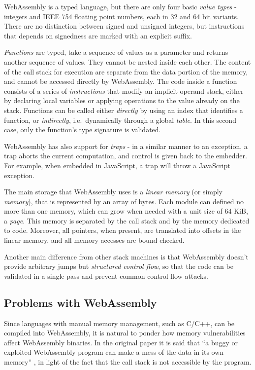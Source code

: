 WebAssembly is a typed language, but there are only four basic \textit{value types} - integers and IEEE 754 floating
point numbers, each in 32 and 64 bit variants. There are no distinction between signed and unsigned integers,
but instructions that depends on signedness are marked with an explicit suffix.

\textit{Functions} are typed, take a sequence of values as a parameter and returns another sequence of values.
They cannot be nested inside each other. The content of the call stack for execution are separate from the data
portion of the memory, and cannot be accessed directly by WebAssembly.
The code inside a function consists of a series of \textit{instructions} that modify an implicit operand stack,
either by declaring local variables or applying operations to the value already on the stack.
Functions can be called either \textit{directly} by using an index that identifies a function, or \textit{indirectly},
i.e.\ dynamically through a global \textit{table}. In this second case, only the function's type signature is validated.

WebAssembly has also support for \textit{traps} - in a similar manner to an exception, a trap aborts the current
computation, and control is given back to the embedder. For example, when embedded in JavaScript, a trap will
throw a JavaScript exception.

The main storage that WebAssembly uses is a \textit{linear memory} (or simply \textit{memory}), that is represented
by an array of bytes. Each module can defined no more than one memory, which can grow when needed with a unit size
of 64 KiB, a \textit{page}. This memory is separated by the call stack and by the memory dedicated to code.
Moreover, all pointers, when present, are translated into offsets in the linear memory, and all memory accesses are bound-checked.

Another main difference from other stack machines is that WebAssembly doesn't provide arbitrary jumps but
\textit{structured control flow}, so that the code can be validated in a single pass and prevent common control flow attacks.

\subsection{Problems with WebAssembly}

Since languages with manual memory management, such as C/C++, can be compiled into WebAssembly,
it is natural to ponder how memory vulnerabilities affect WebAssembly binaries.
In the original paper it is said that ``a buggy or exploited WebAssembly program can make a mess of the data in its own memory''
\cite{bringing-the-web-up-to-speed-2017}, in light of the fact that the call stack is not accessible by the program.


